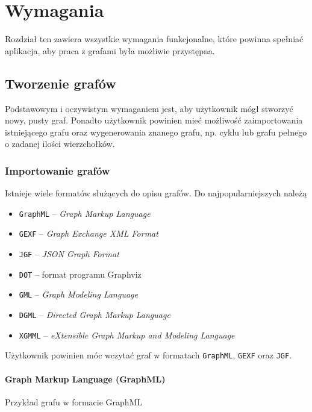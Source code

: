 \chapter{Wymagania}

Rozdział ten zawiera wszystkie wymagania funkcjonalne, które powinna spełniać aplikacja, aby praca z grafami była możliwie przystępna.

\section{Tworzenie grafów}
Podstawowym i oczywistym wymaganiem jest, aby użytkownik mógł stworzyć nowy, pusty graf. Ponadto użytkownik powinien mieć możliwość zaimportowania istniejącego grafu oraz wygenerowania znanego grafu, np. cyklu lub grafu pełnego o zadanej ilości wierzchołków. 

\subsection{Importowanie grafów} \label{subsec:import}
Istnieje wiele formatów służących do opisu grafów. Do najpopularniejszych należą \cite{bernard,gephi}

\begin{itemize}
\setlength\itemsep{0em}
\item \texttt{GraphML} -- \textit{Graph Markup Language}
\item \texttt{GEXF} -- \textit{Graph Exchange XML Format}
\item \texttt{JGF} -- \textit{JSON Graph Format}
\item \texttt{DOT} -- format programu Graphviz
\item \texttt{GML} -- \textit{Graph Modeling Language }
\item \texttt{DGML} -- \textit{Directed Graph Markup Language}
\item \texttt{XGMML} -- \textit{eXtensible Graph Markup and Modeling Language}
\end{itemize}

Użytkownik powinien móc wczytać graf w formatach \texttt{GraphML}, \texttt{GEXF} oraz \texttt{JGF}.

\subsubsection{Graph Markup Language (GraphML)}
\begin{listing}[H]
    \caption{Przykład grafu w formacie GraphML}
    \inputminted{xml}{example.graphml}
    \label{lst:graphml-example}
\end{listing}

